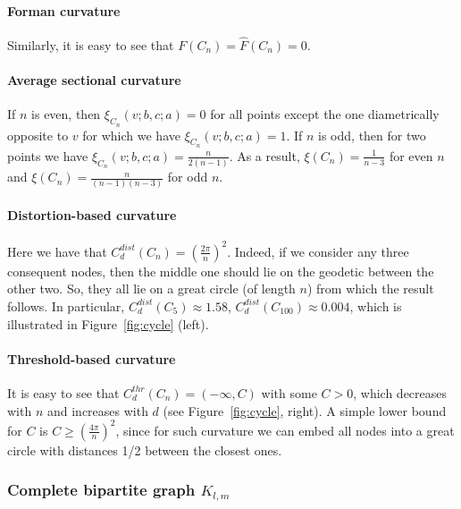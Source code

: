 \documentclass{article} %
\newtheorem{proposition}[theorem]{Proposition}
\begin{document}
\paragraph{Forman curvature} 

Similarly, it is easy to see that $F(C_n) = \hat F(C_n) = 0$.

\paragraph{Average sectional curvature} If $n$ is even, then $\xi_{C_n}(v;b,c;a) = 0$ for all points except the one diametrically opposite to $v$ for which we have $\xi_{C_n}(v;b,c;a) = 1$. If $n$ is odd, then for two points we have $\xi_{C_n}(v;b,c;a) = \frac{n}{2(n-1)}$. As a result, $\xi(C_n) = \frac{1}{n-3}$ for even $n$ and $\xi(C_n) = \frac{n}{(n-1)(n-3)}$ for odd $n$.

\paragraph{Distortion-based curvature} 

Here we have that
$	C_d^{dist}(C_n) = \left(\frac{2\pi}{n}\right)^2.$
Indeed, if we consider any three consequent nodes, then the middle one should lie on the geodetic between the other two. So, they all lie on a great circle (of length $n$) from which the result follows.
In particular, $C_d^{dist}(C_5) \approx 1.58$, $C_d^{dist}(C_{100}) \approx 0.004$, which is illustrated in Figure~\ref{fig:cycle} (left).

\paragraph{Threshold-based curvature} 
It is easy to see that $C_d^{thr}(C_n) = (-\infty, C)$ with some $C>0$, which decreases with $n$ and increases with $d$ (see Figure~\ref{fig:cycle}, right). A simple lower bound for $C$ is $C \ge \left(\frac{4\pi}{n}\right)^2$, since for such curvature we can embed all nodes into a great circle with distances 1/2 between the closest ones. 


\subsubsection{Complete bipartite graph $K_{l,m}$}
\end{document}
